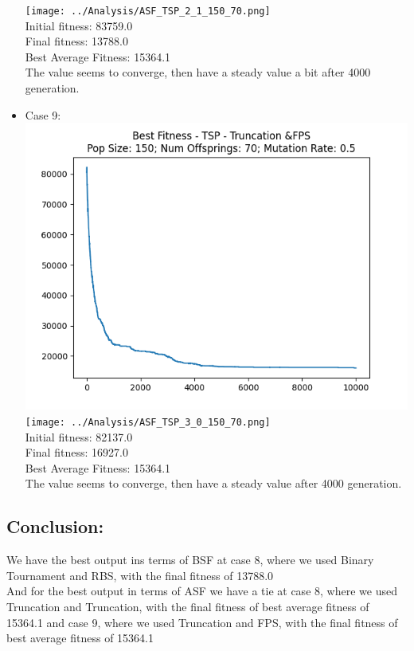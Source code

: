 \documentclass[12pt]{report} %
\begin{document}
\begin{itemize}
	      \texttt{[image: ../Analysis/ASF\_TSP\_2\_1\_150\_70.png]}
	      \\Initial fitness:  83759.0
	      \\Final fitness:  13788.0
	      \\Best Average Fitness: 15364.1
	      \\The value seems to converge, then have a steady value a bit after 4000 generation.
	\item Case 9:\\
	      \includegraphics[scale=0.5]{../Analysis/BSF_TSP_3_0_150_70.png}
	      \texttt{[image: ../Analysis/ASF\_TSP\_3\_0\_150\_70.png]}
	      \\Initial fitness:  82137.0
	      \\Final fitness:  16927.0
	      \\Best Average Fitness: 15364.1
	      \\The value seems to converge, then have a steady value after 4000 generation.
\end{itemize}

\subsection*{Conclusion:}
We have the best output ins terms of BSF at case 8, where we used Binary Tournament and RBS, with the final fitness of 13788.0
\\And for the best output in terms of ASF we have a tie at case 8, where we used Truncation and Truncation,  with the final fitness of best average fitness of 15364.1 and case 9, where we used Truncation and FPS,  with the final fitness of best average fitness of 15364.1
\end{document}
